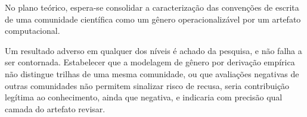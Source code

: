 No plano teórico, espera-se consolidar a caracterização das convenções de escrita de uma comunidade científica como um gênero operacionalizável por um artefato computacional.

Um resultado adverso em qualquer dos níveis é achado da pesquisa, e não falha a ser contornada. Estabelecer que a modelagem de gênero por derivação empírica não distingue trilhas de uma mesma comunidade, ou que avaliações negativas de outras comunidades não permitem sinalizar risco de recusa, seria contribuição legítima ao conhecimento, ainda que negativa, e indicaria com precisão qual camada do artefato revisar.




